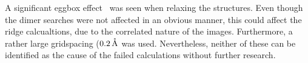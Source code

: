 A significant eggbox effect~\cite{gpaw-2005} was seen when relaxing the structures.
Even though the dimer searches were not affected in an obvious manner, this could affect the ridge calcualtions, due to the correlated nature of the images.
Furthermore, a rather large gridspacing ($0.2 \, \mathrm{\mathring{\mathrm{A}}}$ was used.
Nevertheless, neither of these can be identified as the cause of the failed calculations without further research.
